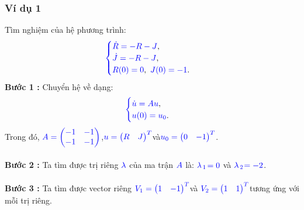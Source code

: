 \documentclass[a4paper]{article}
\begin{document}
\subsubsection{Ví dụ 1}
Tìm nghiệm của hệ phương trình:
\begin{align}
	    \textcolor{blue}{
	    \begin{cases}
            \dot R = -R - J \textcolor{black}{,}\\
            \dot J = -R - J \textcolor{black}{,}\\
            R(0) = 0\textcolor{black}{,} \enskip J(0) = -1 \textcolor{black}{.}
        \end{cases}
        }
        \notag
	\end{align}
{\bfseries Bước 1 :} Chuyển hệ về dạng:
\begin{align}
	    \textcolor{blue}{
	    \begin{cases}
            \dot u = Au \textcolor{black}{,}\\
            u(0) = u\sb{0}\textcolor{black}{.}
        \end{cases}
        }
        \notag
	\end{align}
Trong đó,  $\textcolor{blue}{A = \begin{pmatrix} -1 & -1\\ -1 & -1 \end{pmatrix}}$,\enskip $\textcolor{blue}{u = \begin{pmatrix} R & J \end{pmatrix}\sp{T}}$\enskip và\enskip $\textcolor{blue}{u\sb{0} = \begin{pmatrix} 0 & -1 \end{pmatrix}\sp{T}}$.\\\\
{\bfseries Bước 2 :} Ta tìm được trị riêng $\textcolor{blue}{\lambda}$ của ma trận $\textcolor{blue}{A}$ là: $\textcolor{blue}{\lambda}$$\textcolor{blue}{\sb{1}}$$\textcolor{blue}{=0}$ và $\textcolor{blue}{\lambda}$$\textcolor{blue}{\sb{2}}$$\textcolor{blue}{=-2}$.\\\\
{\bfseries Bước 3 :} Ta tìm được vector riêng \enskip $\textcolor{blue}{V\sb{1} = \begin{pmatrix} 1 & -1 \end{pmatrix}\sp{T}}$\enskip và \enskip $\textcolor{blue}{V\sb{2} = \begin{pmatrix} 1 & 1 \end{pmatrix}\sp{T}}$\enskip tương ứng với mỗi trị riêng.\\\\
\end{document}
